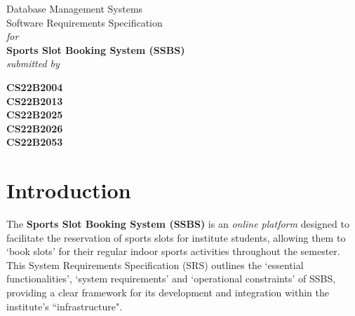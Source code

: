 \documentclass[12pt]{article}
\begin{document}
\large

\newpage

\date{}

\vspace*{10pt}
\begin{center}
{\Huge Database Management Systems} \\[40pt]
{\LARGE Software Requirements Specification} \\[15pt]
\textit{\large for} \\[15pt]
\textbf{\LARGE Sports Slot Booking System (SSBS)} \\[15pt]
\textit{\large submitted by} \\[25pt]
\end{center}
\hspace{2.2cm}{\Large Vignesh Aravindh B} \hspace{1cm} \textbf{\Large CS22B2004} \\[10pt]
\hspace*{2.2cm}{\Large Rajvardhan G} \hspace{2.505cm} \textbf{\Large CS22B2013} \\[10pt]
\hspace*{2.2cm}{\Large Ashrith G} \hspace{3.53cm} \textbf{\Large CS22B2025} \\[10pt]
\hspace*{2.2cm}{\Large P Veeresh Kumar} \hspace{1.725cm} \textbf{\Large CS22B2026} \\[10pt]
\hspace*{2.2cm}{\Large Dhivya Dharshan V} \hspace{1.185cm} \textbf{\Large CS22B2053}

\newpage

\tableofcontents
\listoffigures

\newpage

\section{Introduction}
\hspace{0.8cm} The \textbf{Sports Slot Booking System (SSBS)} is an \textit{online platform} designed to facilitate the reservation of sports slots for institute students, allowing them to `book slots' for their regular indoor sports activities throughout the semester. This System Requirements Specification (SRS) outlines the `essential functionalities', `system requirements' and `operational constraints' of SSBS, providing a clear framework for its development and integration within the institute's ``infrastructure".
\end{document}
